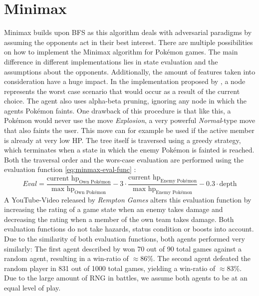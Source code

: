 \section{Minimax}
\label{sec:related-minimax}
Minimax builds upon \ac{BFS} as this algorithm deals with adversarial paradigms by assuming the opponents 
act in their best interest.
There are multiple possibilities on how to implement the Minimax algorithm for Pokémon games. The main difference 
in different implementations lies in state evaluation and the assumptions about the opponents. Additionally,
the amount of features taken into consideration have a huge impact. In the implementation proposed by
\cite{Lee_Togelius_2017}, a node represents the worst case scenario that would occur as a result of the current choice. 
The agent also uses alpha-beta pruning, ignoring any node in which the agents Pokémon faints. 
One drawback of this procedure is that like this, a Pokémon would never use the move \textit{Explosion},
a very powerful \textit{Normal}-type move that also faints the user. This move can for example be used if
the active member is already at very low \ac{HP}.
The tree itself is traversed using a greedy strategy, which terminates when a state in which the enemy 
Pokémon is fainted is reached. Both the traversal order and the wors-case evaluation are performed using
the evaluation function \ref{eq:minmax-eval-func} \cite{Lee_Togelius_2017}:
\begin{equation}
\label{eq:minmax-eval-func}
    Eval = \frac{\text{current hp}_{\text{Own Pokémon}}}{\text{max hp}_{\text{Own Pokémon}}} -
    3 \cdot \frac{\text{current hp}_{\text{Enemy Pokémon}}}{\text{max hp}_{\text{Enemy Pokémon}}} -
    0.3 \cdot \text{depth}
\end{equation}
A YouTube-Video released by \emph{Rempton Games} \cite{RemptonGames:PokemonAI} alters this evaluation function
by increasing the rating of a game state when an enemy takes damage and decreasing the rating when a member
of the own team takes damage. Both evaluation functions do not take hazards, status condition or boosts 
into account. Due to the similarity of both evaluation functions, both agents performed very similarly:
The first agent described by \cite{Lee_Togelius_2017} won 70 out of 90 total games against a random agent,
resulting in a win-ratio of $\approx 86\%$. The second agent defeated the random player in 831 out of 1000
total games, yielding a win-ratio of $\approx 83\%$. Due to the large amount of \ac{RNG} in battles, we assume
both agents to be at an equal level of play. \\

